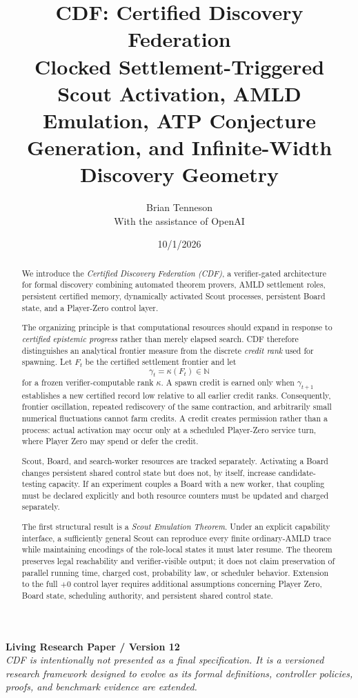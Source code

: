 \documentclass[11pt]{article}
\title{\textbf{CDF: Certified Discovery Federation}\\[0.5em]
\large Clocked Settlement-Triggered Scout Activation, AMLD Emulation, ATP Conjecture Generation, and Infinite-Width Discovery Geometry}
\author{Brian Tenneson\\[0.5em]\normalsize With the assistance of OpenAI}
\date{10/1/2026}
\theoremstyle{definition}
\begin{document}
\maketitle

\begin{center}
\small
\textbf{Living Research Paper / Version 12}\\[0.25em]
\emph{CDF is intentionally not presented as a final specification. It is a versioned research framework designed to evolve as its formal definitions, controller policies, proofs, and benchmark evidence are extended.}
\end{center}
\vspace{0.5em}

\begin{abstract}
We introduce the \emph{Certified Discovery Federation (CDF)}, a verifier-gated architecture for formal discovery combining automated theorem provers, AMLD settlement roles, persistent certified memory, dynamically activated Scout processes, persistent Board state, and a Player-Zero control layer.

The organizing principle is that computational resources should expand in response to \emph{certified epistemic progress} rather than merely elapsed search. CDF therefore distinguishes an analytical frontier measure from the discrete \emph{credit rank} used for spawning. Let $F_t$ be the certified settlement frontier and let
\[
\gamma_t=\kappa(F_t)\in\mathbb N
\]
for a frozen verifier-computable rank $\kappa$. A spawn credit is earned only when $\gamma_{t+1}$ establishes a new certified record low relative to all earlier credit ranks. Consequently, frontier oscillation, repeated rediscovery of the same contraction, and arbitrarily small numerical fluctuations cannot farm credits. A credit creates permission rather than a process: actual activation may occur only at a scheduled Player-Zero service turn, where Player Zero may spend or defer the credit.

Scout, Board, and search-worker resources are tracked separately. Activating a Board changes persistent shared control state but does not, by itself, increase candidate-testing capacity. If an experiment couples a Board with a new worker, that coupling must be declared explicitly and both resource counters must be updated and charged separately.

The first structural result is a \emph{Scout Emulation Theorem}. Under an explicit capability interface, a sufficiently general Scout can reproduce every finite ordinary-AMLD trace while maintaining encodings of the role-local states it must later resume. The theorem preserves legal reachability and verifier-visible output; it does not claim preservation of parallel running time, charged cost, probability law, or scheduler behavior. Extension to the full $+0$ control layer requires additional assumptions concerning Player Zero, Board state, scheduling authority, and persistent shared control state.


\end{abstract}
\end{document}
